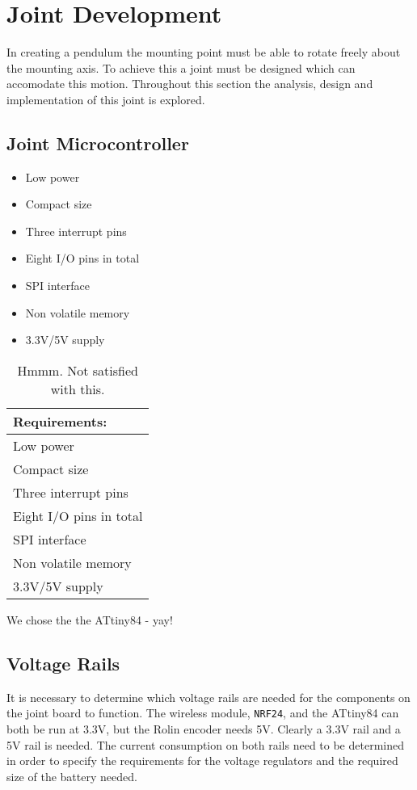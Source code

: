 \section{Joint Development}
\label{sec:joint_development}
In creating a pendulum the mounting point must be able to rotate freely about the mounting axis.
To achieve this a joint must be designed which can accomodate this motion.
Throughout this section the analysis, design and implementation of this joint is explored.




\subsection{Joint Microcontroller}
\label{sub:joint_microcontroller}


\begin{itemize}
	\item Low power
	\item Compact size
	\item Three interrupt pins
	\item Eight I/O pins in total 
	\item SPI interface
	\item Non volatile memory
	\item 3.3V/5V supply
\end{itemize}


\begin{table}
	\centering
	\begin{tabular}{l}
		 \textbf{Requirements:} \\ \hline
		 Low power \\ \hline
		 Compact size \\ \hline
		 Three interrupt pins \\ \hline
		 Eight I/O pins in total\\ \hline
		 SPI interface \\ \hline
		 Non volatile memory \\ \hline
		 3.3V/5V supply \\ \hline
	\end{tabular}
	\caption{Hmmm. Not satisfied with this.}
	\label{tab:joint_mic_rec}
\end{table}

We chose the the ATtiny84 - yay!


\subsection{Voltage Rails}
\label{sub:voltage_rail}
It is necessary to determine which voltage rails are needed for the components on the joint board to function.
The wireless module, \texttt{NRF24}, and the ATtiny84 can both be run at 3.3V, but the Rolin encoder needs 5V.
Clearly a 3.3V rail and a 5V rail is needed. 
The current consumption on both rails need to be determined in order to specify the requirements for the voltage regulators and the required size of the battery needed.


